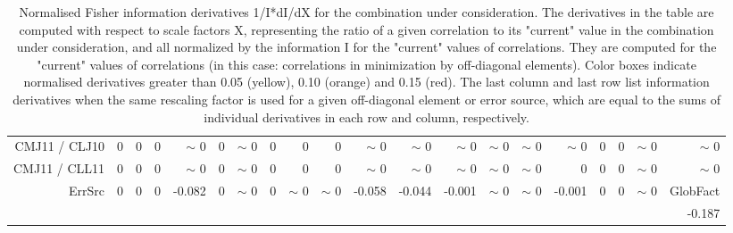 \begin{table}[H]
\begin{center}
\begin{tabular}{|r|rrrrrrrrrrrrrrrrrr|r|}
CMJ11 / CLJ10 &  0 &  0 &  0 &  {\tiny $\sim$ }0 &  0 &  {\tiny $\sim$ }0 &  0 &  0 &  0 &  {\tiny $\sim$ }0 &  {\tiny $\sim$ }0 &  {\tiny $\sim$ }0 &  {\tiny $\sim$ }0 &  {\tiny $\sim$ }0 &  {\tiny $\sim$ }0 &  0 &  0 &  {\tiny $\sim$ }0 &  {\tiny $\sim$ }0 \\
CMJ11 / CLL11 &  0 &  0 &  0 &  {\tiny $\sim$ }0 &  0 &  {\tiny $\sim$ }0 &  0 &  0 &  0 &  {\tiny $\sim$ }0 &  {\tiny $\sim$ }0 &  {\tiny $\sim$ }0 &  {\tiny $\sim$ }0 &  {\tiny $\sim$ }0 &  0 &  0 &  0 &  {\tiny $\sim$ }0 &  {\tiny $\sim$ }0 \\
\hline
\multirow{2}{*}{ErrSrc} & \multirow{2}{*}{ 0} & \multirow{2}{*}{ 0} & \multirow{2}{*}{ 0} & \multirow{2}{*}{    -0.082} & \multirow{2}{*}{ 0} & \multirow{2}{*}{ {\tiny $\sim$ }0} & \multirow{2}{*}{ 0} & \multirow{2}{*}{ {\tiny $\sim$ }0} & \multirow{2}{*}{ {\tiny $\sim$ }0} & \multirow{2}{*}{    -0.058} & \multirow{2}{*}{    -0.044} & \multirow{2}{*}{    -0.001} & \multirow{2}{*}{ {\tiny $\sim$ }0} & \multirow{2}{*}{ {\tiny $\sim$ }0} & \multirow{2}{*}{    -0.001} & \multirow{2}{*}{ 0} & \multirow{2}{*}{ 0} & \multirow{2}{*}{ {\tiny $\sim$ }0} & GlobFact\\
 & & & & & & & & & & & & & & & & & & &     -0.187 \\
\hline
\end{tabular}
\renewcommand{\arraystretch}{1}
\caption{Normalised Fisher information derivatives 1/I*dI/dX for the combination under consideration. The derivatives in the table are computed with respect to scale factors X, representing the ratio of a given correlation to its "current" value in the combination under consideration, and all normalized by the information I for the "current" values of correlations. They are computed for the "current" values of correlations (in this case: correlations in minimization by off-diagonal elements). Color boxes indicate normalised derivatives greater than 0.05 (yellow), 0.10 (orange) and 0.15 (red). The last column and last row list information derivatives when the same rescaling factor is used for a given off-diagonal element or error source, which are equal to the sums of individual derivatives in each row and column, respectively.}
\end{center}
\end{table}

